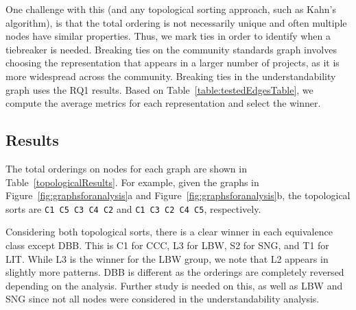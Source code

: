 One challenge with this (and any topological sorting approach, such as Kahn's algorithm), is that the total ordering is not necessarily unique and often multiple nodes have similar properties.
Thus, we mark ties in order to identify when a tiebreaker is needed.
Breaking ties on the community standards graph involves choosing the representation that appears in a larger number of projects, as it is more widespread across the community.
Breaking ties in the understandability graph uses the RQ1 results. Based on Table~\ref{table:testedEdgesTable}, we compute the average metrics for each representation and select the winner.

\subsection{Results}
The total orderings on nodes for each graph are shown in Table~\ref{topologicalResults}. For example, given the graphs in Figure~\ref{fig:graphsforanalysis}a and Figure~\ref{fig:graphsforanalysis}b, the topological sorts are {\tt C1 C5 C3 C4 C2} and {\tt C1 C3 C2 C4 C5}, respectively.



Considering both topological sorts, there is a clear winner in each equivalence class except DBB. 
This is C1 for CCC, L3 for LBW, S2 for SNG, and T1 for LIT.
While L3 is the winner for the LBW group, we note that L2 appears in slightly more patterns.
DBB is different as the orderings are completely reversed depending on the analysis. %
Further study is needed on this, as well as LBW and SNG since not all nodes were considered in the understandability analysis.

